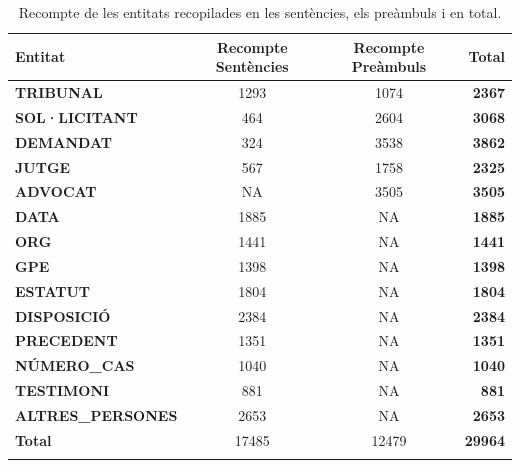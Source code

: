 \begin{table}[H]
    \centering
    \begin{tabular}{lccr}
        \Xhline{2\arrayrulewidth}
        Entitat & Recompte Sentències & Recompte Preàmbuls & Total \\
        \hline
        \textbf{TRIBUNAL} & 1293 & 1074 & \textbf{2367} \\
        \textbf{SOL·LICITANT} & 464 & 2604 & \textbf{3068} \\
        \textbf{DEMANDAT} & 324 & 3538 & \textbf{3862} \\
        \textbf{JUTGE} & 567 & 1758 & \textbf{2325} \\
        \textbf{ADVOCAT} & NA & 3505 & \textbf{3505} \\
        \textbf{DATA} & 1885 & NA & \textbf{1885} \\
        \textbf{ORG} & 1441 & NA & \textbf{1441} \\
        \textbf{GPE} & 1398 & NA & \textbf{1398} \\
        \textbf{ESTATUT} & 1804 & NA & \textbf{1804} \\
        \textbf{DISPOSICIÓ} & 2384 & NA & \textbf{2384} \\
        \textbf{PRECEDENT} & 1351 & NA & \textbf{1351} \\
        \textbf{NÚMERO\_CAS} & 1040 & NA & \textbf{1040} \\
        \textbf{TESTIMONI} & 881 & NA & \textbf{881} \\
        \textbf{ALTRES\_PERSONES} & 2653 & NA & \textbf{2653} \\
        \hline
        \textbf{Total} & 17485 & 12479 & \textbf{29964} \\
        \Xhline{2\arrayrulewidth}
    \end{tabular}
    \caption[Recompte de les entitats en les sentències, els preàmbuls i en total.]{Recompte de les entitats recopilades en les sentències, els preàmbuls i en total.}
    \label{tab:recompte_entitats}
\end{table}

